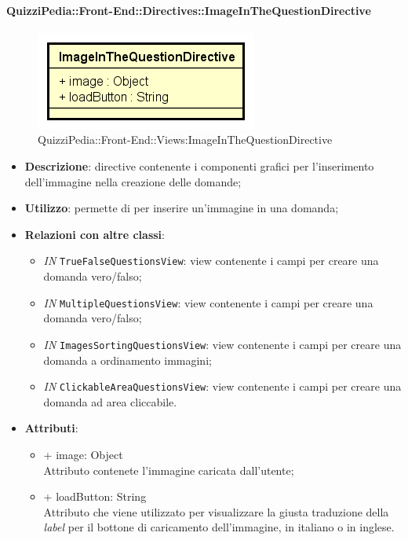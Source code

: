 \paragraph{QuizziPedia::Front-End::Directives::ImageInTheQuestionDirective}
\begin{figure} [ht]
	\centering
	\includegraphics[scale=0.45]{UML/Classi/Front-End/QuizziPedia_Front-end_ImageInTheQuestionDirective.png}
	\caption{QuizziPedia::Front-End::Views:ImageInTheQuestionDirective}
\end{figure} \FloatBarrier
\begin{itemize}
	\item \textbf{Descrizione}: directive contenente i componenti grafici per l'inserimento dell'immagine nella creazione delle domande;
	\item \textbf{Utilizzo}: permette di per inserire un'immagine in una domanda;
	\item \textbf{Relazioni con altre classi}:
	\begin{itemize}
		\item \textit{IN} \texttt{TrueFalseQuestionsView}: view contenente i campi per creare una domanda vero/falso; 
		\item \textit{IN} \texttt{MultipleQuestionsView}:  view contenente i campi per creare una domanda vero/falso; 
		\item \textit{IN} \texttt{ImagesSortingQuestionsView}: view contenente i campi per creare una domanda a ordinamento immagini;
		\item \textit{IN} \texttt{ClickableAreaQuestionsView}:  view contenente i campi per creare una domanda ad area cliccabile.
	\end{itemize}
	\item \textbf{Attributi}:
	\begin{itemize}
		\item {+ image: Object} \\ Attributo contenete l'immagine caricata dall'utente;
		\item {+ loadButton: String} \\ Attributo che viene utilizzato per visualizzare la giusta traduzione della \textit{label} per il bottone di caricamento dell'immagine, in italiano o in inglese. 
	\end{itemize}
\end{itemize}